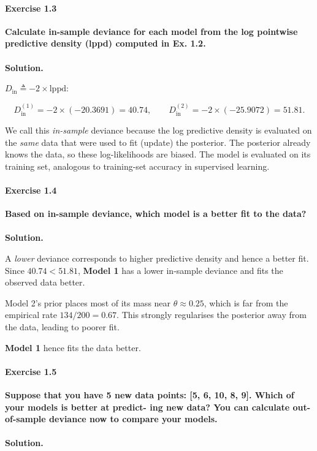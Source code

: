 \documentclass[12pt]{scrartcl}
\begin{document}
\paragraph*{Exercise 1.3} \textbf{Calculate in-sample deviance for each model from the log pointwise predictive density (lppd)
computed in Ex. 1.2.}
\\ \\
\textbf{Solution.}

$D_{\text{in}} \triangleq -2\times\mathrm{lppd}$:

\[
  D_{\text{in}}^{(1)} = -2 \times (-20.3691) = \mathbf{40.74}, \qquad
  D_{\text{in}}^{(2)} = -2 \times (-25.9072) = \mathbf{51.81}.
\]

We call this \emph{in-sample} deviance because the log predictive density is evaluated on the \emph{same} data that were used to fit (update) the posterior. The posterior already knows the data, so these log-likelihoods are biased. The model is evaluated on its training set, analogous to training-set accuracy in supervised learning.

\paragraph*{Exercise 1.4} \textbf{Based on in-sample deviance, which model is a better fit to the data?}
\\ \\ 
\textbf{Solution.}

A \emph{lower} deviance corresponds to higher predictive density and hence a better fit. Since $40.74 < 51.81$, \textbf{Model 1} has a lower in-sample deviance and fits the observed data better.

Model 2's prior places most of its mass near $\theta \approx 0.25$, which is far from the empirical rate $134/200 = 0.67$. This strongly regularises the posterior away from the data, leading to poorer fit.

\textbf{Model 1} hence fits the data better. \Box

\paragraph*{Exercise 1.5} \textbf{Suppose that you have 5 new data points: [5, 6, 10, 8, 9]. Which of your models is better at predict-
ing new data? You can calculate out-of-sample deviance now to compare your models.}
\\ \\
\textbf{Solution.}
\end{document}
